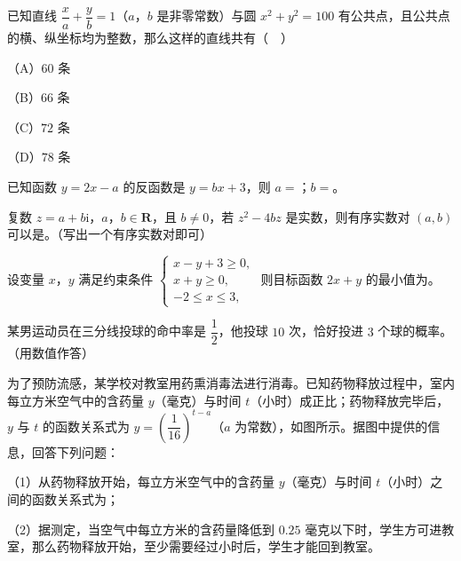 \begin{question}
已知直线 $\dfrac xa+\dfrac yb=1$（$a$，$b$ 是非零常数）与圆 $x^2+y^2=100$ 有公共点，且公共点的横、纵坐标均为整数，那么这样的直线共有（　）

（A）$60$ 条

（B）$66$ 条

（C）$72$ 条

（D）$78$ 条

\end{question}

\begin{question}
已知函数 $y=2x-a$ 的反函数是 $y=bx+3$，则 $a=$\gkblank{}；$b=$\gkblank{}。

\end{question}
\begin{question}
复数 $z=a+b\mathrm i$，$a$，$b\in\mathbf R$，且 $b\neq0$，若 $z^2-4bz$ 是实数，则有序实数对 $(a,b)$ 可以是\gkblank{}。（写出一个有序实数对即可）

\end{question}
\begin{question}
设变量 $x$，$y$ 满足约束条件 $\begin{cases}x-y+3\geqslant0,\\ x+y\geqslant0,\\ -2\leqslant x\leqslant3,\end{cases}$ 则目标函数 $2x+y$ 的最小值为\gkblank{}。

\end{question}
\begin{question}
某男运动员在三分线投球的命中率是 $\dfrac12$，他投球 $10$ 次，恰好投进 $3$ 个球的概率\gkblank{}。（用数值作答）

\Needspace{0.4\textheight}
\end{question}
\begin{question}
为了预防流感，某学校对教室用药熏消毒法进行消毒。已知药物释放过程中，室内每立方米空气中的含药量 $y$（毫克）与时间 $t$（小时）成正比；药物释放完毕后，$y$ 与 $t$ 的函数关系式为 $y=\left(\dfrac1{16}\right)^{t-a}$（$a$ 为常数），如图所示。据图中提供的信息，回答下列问题：

（1）从药物释放开始，每立方米空气中的含药量 $y$（毫克）与时间 $t$（小时）之间的函数关系式为\gkblank{}；

（2）据测定，当空气中每立方米的含药量降低到 $0.25$ 毫克以下时，学生方可进教室，那么药物释放开始，至少需要经过\gkblank{}小时后，学生才能回到教室。
\nopagebreak[4]
\begin{center}\end{center}
\nopagebreak[4]
\end{question}

